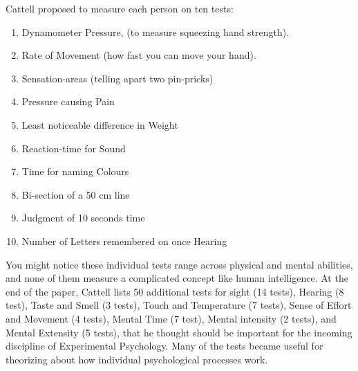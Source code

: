 \documentclass[
  oneside,
  12pt]{crumpbook}
\providecommand{\tightlist}{%
  \setlength{\itemsep}{0pt}\setlength{\parskip}{0pt}}
\begin{document}
Cattell proposed to measure each person on ten tests:

\begin{enumerate}
\def\labelenumi{\arabic{enumi}.}
\tightlist
\item
  Dynamometer Pressure, (to measure squeezing hand strength).
\item
  Rate of Movement (how fast you can move your hand).
\item
  Sensation-areas (telling apart two pin-pricks)
\item
  Pressure causing Pain
\item
  Least noticeable difference in Weight
\item
  Reaction-time for Sound
\item
  Time for naming Colours
\item
  Bi-section of a 50 cm line
\item
  Judgment of 10 seconds time
\item
  Number of Letters remembered on once Hearing
\end{enumerate}

You might notice these individual tests range across physical and mental abilities, and none of them measure a complicated concept like human intelligence. At the end of the paper, Cattell lists 50 additional tests for sight (14 tests), Hearing (8 test), Taste and Smell (3 tests), Touch and Temperature (7 tests), Sense of Effort and Movement (4 tests), Mental Time (7 test), Mental intensity (2 tests), and Mental Extensity (5 tests), that he thought should be important for the incoming discipline of Experimental Psychology. Many of the tests became useful for theorizing about how individual psychological processes work.
\end{document}
